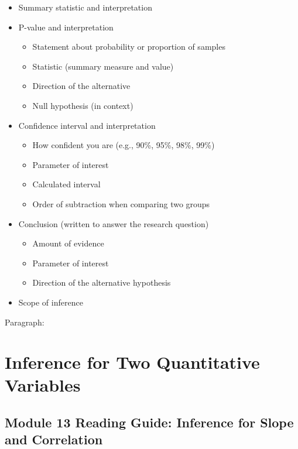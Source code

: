 \documentclass[
]{report}
\begin{document}
\begin{itemize}
\item
  Summary statistic and interpretation
\item
  P-value and interpretation

  \begin{itemize}
  \item
    Statement about probability or proportion of samples
  \item
    Statistic (summary measure and value)
  \item
    Direction of the alternative
  \item
    Null hypothesis (in context)
  \end{itemize}
\item
  Confidence interval and interpretation

  \begin{itemize}
  \item
    How confident you are (e.g., 90\%, 95\%, 98\%, 99\%)
  \item
    Parameter of interest
  \item
    Calculated interval
  \item
    Order of subtraction when comparing two groups
  \end{itemize}
\item
  Conclusion (written to answer the research question)

  \begin{itemize}
  \item
    Amount of evidence
  \item
    Parameter of interest
  \item
    Direction of the alternative hypothesis
  \end{itemize}
\item
  Scope of inference
\end{itemize}

\newpage

Paragraph:

\newpage

\hypertarget{inference-for-two-quantitative-variables}{%
\chapter{Inference for Two Quantitative Variables}\label{inference-for-two-quantitative-variables}}

\hypertarget{module-13-reading-guide-inference-for-slope-and-correlation}{%
\section{Module 13 Reading Guide: Inference for Slope and Correlation}\label{module-13-reading-guide-inference-for-slope-and-correlation}}
\end{document}

